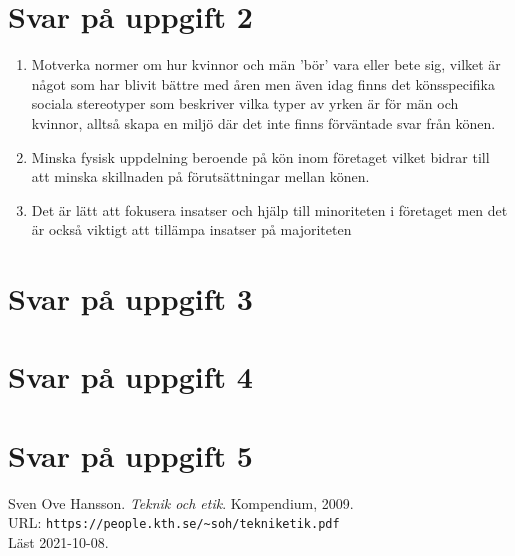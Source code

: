 \documentclass[a4paper,12pt]{article}
\begin{document}
\section*{Svar på uppgift 2}


\begin{enumerate}
  \item Motverka normer om hur kvinnor och män 'bör' vara eller bete sig,
  vilket är något som har blivit bättre med åren men även idag finns det
  könsspecifika sociala stereotyper som beskriver vilka typer av yrken är för
  män och kvinnor, alltså skapa en miljö där det inte finns förväntade svar
  från könen.
  \item Minska fysisk uppdelning beroende på kön inom företaget vilket bidrar
  till att minska skillnaden på förutsättningar mellan könen.
  \item Det är lätt att fokusera insatser och hjälp till minoriteten i
  företaget men det är också viktigt att tillämpa insatser på majoriteten 
\end{enumerate}
  
\section*{Svar på uppgift 3}



\section*{Svar på uppgift 4}


\section*{Svar på uppgift 5}


\begin{thebibliography}{99}
   Sven Ove Hansson. \emph{Teknik och etik}.  Kompendium, 2009.
    \\
    URL: \verb|https://people.kth.se/~soh/tekniketik.pdf| \\
    Läst 2021-10-08. 
  \end{thebibliography}
\end{document}
